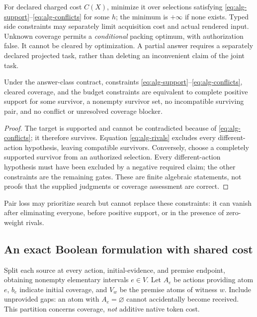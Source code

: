 For declared charged cost $C(X)$, minimize it over selections satisfying
\eqref{eq:alg-support}--\eqref{eq:alg-conflicts} for some $h$; the minimum is
$+\infty$ if none exists. Typed side constraints may separately limit
acquisition cost and actual rendered input. Unknown coverage permits a
\emph{conditional} packing optimum, with authorization false. It cannot be
cleared by optimization. A partial answer requires a separately declared
projected task, rather than deleting an inconvenient claim of the joint task.

\begin{proposition}
Under the answer-class contract, constraints
\eqref{eq:alg-support}--\eqref{eq:alg-conflicts}, cleared coverage, and the
budget constraints are equivalent to complete positive support for some
survivor, a nonempty survivor set, no incompatible surviving pair, and no
conflict or unresolved coverage blocker.
\end{proposition}
\begin{proof}
The target is supported and cannot be contradicted because of
\eqref{eq:alg-conflicts}; it therefore survives. Equation
\eqref{eq:alg-rivals} excludes every different-action hypothesis, leaving
compatible survivors. Conversely, choose a completely supported survivor
from an authorized selection. Every different-action hypothesis must have
been excluded by a negative required claim; the other constraints are the
remaining gates. These are finite algebraic statements, not proofs that the
supplied judgments or coverage assessment are correct.
\end{proof}

Pair loss may prioritize search but cannot replace these constraints: it can
vanish after eliminating everyone, before positive support, or in the
presence of zero-weight rivals.

\subsection{An exact Boolean formulation with shared cost}

Split each source at every action, initial-evidence, and premise endpoint,
obtaining nonempty elementary intervals $e\in V$. Let $A_e$ be actions
providing atom $e$, $b_e$ indicate initial coverage, and $V_w$ be the premise
atoms of witness $w$. Include unprovided gaps: an atom with $A_e=\varnothing$
cannot accidentally become received. This partition concerns coverage,
\emph{not} additive native token cost.

